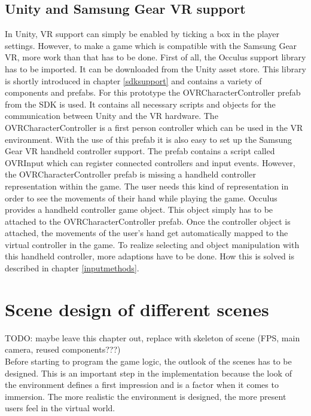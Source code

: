 \subsection{Unity and Samsung Gear VR support} \label{gearvrsupport}
In Unity, VR support can simply be enabled by ticking a box in the player settings. However, to make a game which is compatible with the Samsung Gear VR, more work than that has to be done. First of all, the Occulus support library has to be imported. It can be downloaded from the Unity asset store. This library is shortly introduced in chapter \ref{sdksupport} and contains a variety of components and prefabs. For this prototype the OVRCharacterController prefab from the SDK is used. It contains all necessary scripts and objects for the communication between Unity and the VR hardware. The OVRCharacterController is a first person controller which can be used in the VR environment. With the use of this prefab it is also easy to set up the Samsung Gear VR handheld controller support. The prefab contains a script called OVRInput which can register connected controllers and input events. However, the OVRCharacterController prefab is missing a handheld controller representation within the game. The user needs this kind of representation in order to see the movements of their hand while playing the game. Occulus provides a handheld controller game object. This object simply has to be attached to the OVRCharacterController prefab. Once the controller object is attached, the movements of the user's hand get automatically mapped to the virtual controller in the game. To realize selecting and object manipulation with this handheld controller, more adaptions have to be done. How this is solved is described in chapter \ref{inputmethods}.

\section{Scene design of different scenes}
TODO: maybe leave this chapter out, replace with skeleton of scene (FPS, main camera, reused components???)\\
Before starting to program the game logic, the outlook of the scenes has to be designed. This is an important step in the implementation because the look of the environment defines a first impression and is a factor when it comes to immersion. The more realistic the environment is designed, the more present users feel in the virtual world.
